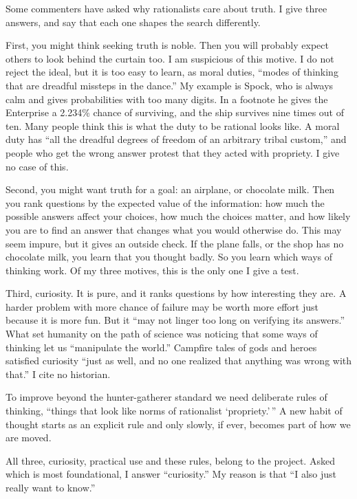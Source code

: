 
Some commenters have asked why rationalists care about truth. I give three answers, and say that each one shapes the search differently.

First, you might think seeking truth is noble. Then you will probably expect others to look behind the curtain too. I am suspicious of this motive. I do not reject the ideal, but it is too easy to learn, as moral duties, ``modes of thinking that are dreadful missteps in the dance.'' My example is Spock, who is always calm and gives probabilities with too many digits. In a footnote he gives the Enterprise a 2.234\% chance of surviving, and the ship survives nine times out of ten. Many people think this is what the duty to be rational looks like.  A moral duty has ``all the dreadful degrees of freedom of an arbitrary tribal custom,'' and people who get the wrong answer protest that they acted with propriety. I give no case of this.

Second, you might want truth for a goal: an airplane, or chocolate milk. Then you rank questions by the expected value of the information: how much the possible answers affect your choices, how much the choices matter, and how likely you are to find an answer that changes what you would otherwise do. This may seem impure, but it gives an outside check. If the plane falls, or the shop has no chocolate milk, you learn that you thought badly. So you learn which ways of thinking work. Of my three motives, this is the only one I give a test.

Third, curiosity. It is pure, and it ranks questions by how interesting they are. A harder problem with more chance of failure may be worth more effort just because it is more fun. But it ``may not linger too long on verifying its answers.'' What set humanity on the path of science was noticing that some ways of thinking let us ``manipulate the world.'' Campfire tales of gods and heroes satisfied curiosity ``just as well, and no one realized that anything was wrong with that.'' I cite no historian. 

To improve beyond the hunter-gatherer standard we need deliberate rules of thinking, ``things that look like norms of rationalist `propriety.'\,'' A new habit of thought starts as an explicit rule and only slowly, if ever, becomes part of how we are moved. 

All three, curiosity, practical use and these rules, belong to the project. Asked which is most foundational, I answer ``curiosity.'' My reason is that ``I also just really want to know.'' 
